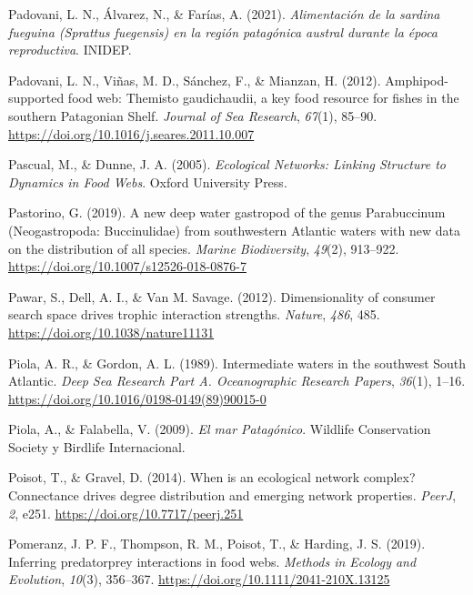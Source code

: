 \documentclass[preprint, 3p,
authoryear]{elsarticle} %
\newlength{\cslhangindent}
\newlength{\cslentryspacingunit} %
\newenvironment{CSLReferences}[2] %
 {%
  \setlength{\parindent}{0pt}
  \ifodd #1
  \let\oldpar\par
  \def\par{\hangindent=\cslhangindent\oldpar}
  \fi
  \setlength{\parskip}{#2\cslentryspacingunit}
 }%
 {}
\begin{document}
\begin{CSLReferences}{1}{0}
\leavevmode{}%
Padovani, L. N., Álvarez, N., \& Farías, A. (2021). \emph{Alimentación
de la sardina fueguina ({Sprattus} fuegensis) en la región patagónica
austral durante la época reproductiva}. {INIDEP}.

\leavevmode{}%
Padovani, L. N., Viñas, M. D., Sánchez, F., \& Mianzan, H. (2012).
Amphipod-supported food web: {Themisto} gaudichaudii, a key food
resource for fishes in the southern {Patagonian Shelf}. \emph{Journal of
Sea Research}, \emph{67}(1), 85--90.
\url{https://doi.org/10.1016/j.seares.2011.10.007}

\leavevmode{}%
Pascual, M., \& Dunne, J. A. (2005). \emph{Ecological {Networks}:
{Linking Structure} to {Dynamics} in {Food Webs}}. {Oxford University
Press}.

\leavevmode{}%
Pastorino, G. (2019). A new deep water gastropod of the genus
{Parabuccinum} ({Neogastropoda}: {Buccinulidae}) from southwestern
{Atlantic} waters with new data on the distribution of all species.
\emph{Marine Biodiversity}, \emph{49}(2), 913--922.
\url{https://doi.org/10.1007/s12526-018-0876-7}

\leavevmode{}%
Pawar, S., Dell, A. I., \& Van M. Savage. (2012). Dimensionality of
consumer search space drives trophic interaction strengths.
\emph{Nature}, \emph{486}, 485.
\url{https://doi.org/10.1038/nature11131}

\leavevmode{}%
Piola, A. R., \& Gordon, A. L. (1989). Intermediate waters in the
southwest {South Atlantic}. \emph{Deep Sea Research Part A.
Oceanographic Research Papers}, \emph{36}(1), 1--16.
\url{https://doi.org/10.1016/0198-0149(89)90015-0}

\leavevmode{}%
Piola, A., \& Falabella, V. (2009). \emph{El mar {Patagónico}}.
{Wildlife Conservation Society y Birdlife Internacional}.

\leavevmode{}%
Poisot, T., \& Gravel, D. (2014). When is an ecological network complex?
{Connectance} drives degree distribution and emerging network
properties. \emph{PeerJ}, \emph{2}, e251.
\url{https://doi.org/10.7717/peerj.251}

\leavevmode{}%
Pomeranz, J. P. F., Thompson, R. M., Poisot, T., \& Harding, J. S.
(2019). Inferring predator\textendash prey interactions in food webs.
\emph{Methods in Ecology and Evolution}, \emph{10}(3), 356--367.
\url{https://doi.org/10.1111/2041-210X.13125}


\end{CSLReferences}
\end{document}
